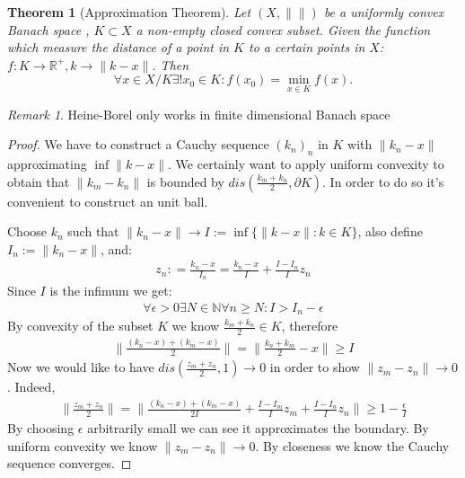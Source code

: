 \documentclass[a4paper,11pt,fleqn]{book}
\newtheorem{theorem}{Theorem}[section]
\theoremstyle{definition}
\theoremstyle{remark}
\newtheorem*{remark}{Remark}
\begin{document}
\begin{theorem}[Approximation Theorem]
	Let $(X, \|\|)$ be a uniformly convex Banach space , $K \subset X$ a non-empty closed convex subset. Given the function which measure the distance of a point in $K$ to a certain points in $X$: $f:K \rightarrow \mathbb{R}^+, k \rightarrow \|k - x\|$. Then
	\begin{equation*}
		\forall x \in X\slash K \exists ! x_0 \in K: f(x_0) = \min_{x \in K} f(x).
	\end{equation*}
\end{theorem}

\begin{remark}
Heine-Borel only works in finite dimensional Banach space
\end{remark}

\begin{proof}
We have to construct a Cauchy sequence $(k_n)_n$ in $K$ with $\|k_n - x\|$ approximating $\inf \|k - x\|$. We certainly want to apply uniform convexity to obtain that $\|k_m - k_n\|$ is bounded by $dis(\frac{k_m + k_n}{2}, \partial K)$. In order to do so it's convenient to construct an unit ball.\par
Choose $k_n$ such that $\|k_n - x\| \rightarrow I:= \inf \{ \|k - x\|: k \in K\}$, also define $I_n := \|k_n - x\|$, and:
\begin{align*}
	z_n: = \frac{k_n - x}{I_n} = \frac{k_n - x}{I} + \frac{I - I_n}{I} z_n
\end{align*}
Since $I$ is the infimum 
we get:
\begin{align*}
	\forall \epsilon > 0 \exists N \in \mathbb{N} \forall n \geq N: I > I_n - \epsilon
\end{align*}
By convexity of the subset $K$ we know $\frac{k_m + k_n}{2}\in K $, therefore
\begin{align*}
	\|\frac{(k_n - x) + (k_m - x)}{2}\| = \|\frac{k_n + k_m}{2} -x \| \geq I
\end{align*}
Now we would like to have $dis(\frac{z_m + z_n}{2}, 1)\rightarrow 0 $ in order to show $\|z_m - z_n\| \rightarrow 0$. Indeed, 
\begin{align*}
	\|\frac{z_m + z_n}{2}\| = \| \frac{(k_n - x) + (k_m - x) }{2I} + \frac{I - I_m}{I}z_m + \frac{I - I_n}{I}z_n \| \ge 1 - \frac{\epsilon}{I}
\end{align*} 
By choosing $\epsilon$ arbitrarily small we can see it approximates the boundary. By uniform convexity we know $\| z_m - z_n \| \rightarrow 0$. By closeness we know the Cauchy sequence converges.
\end{proof}
\end{document}
